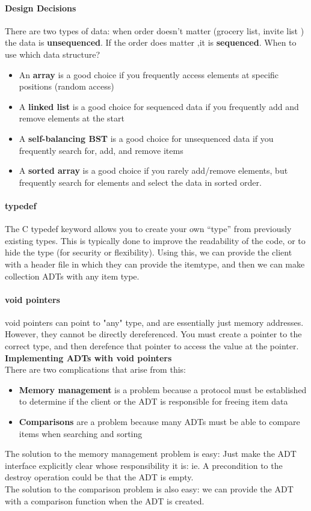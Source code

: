 \documentclass[10pt,letter]{article}
\begin{document}
{\paragraph{Design Decisions} There are two types of data: when order doesn't matter (grocery list, invite list ) the data is \textbf{unsequenced}. If the order does matter ,it is \textbf{sequenced}. When to use which data structure? \begin{itemize}
    \item An \textbf{array} is a good choice if you frequently access elements at specific positions (random access)
    \item A \textbf{linked list} is a good choice for sequenced data if you frequently add and remove elements at the start 
    \item A \textbf{self-balancing BST} is a good choice for unsequenced data if you frequently search for, add, and remove items 
    \item A \textbf{sorted array} is a good choice if you rarely add/remove elements, but frequently search for elements and select the data in sorted order. 
\end{itemize}

\paragraph{typedef} The C typedef keyword allows you to create your own “type” from previously existing types. This is typically done to improve the readability of the code, or to hide the type (for security or flexibility). Using this, we can provide the client with a header file in which they can provide the itemtype, and then we can make collection ADTs with any item type. 

\paragraph{void pointers} void pointers can point to "any" type, and are essentially just memory addresses. However, they cannot be directly dereferenced. You must create a pointer to the correct type, and then derefence that pointer to access the value at the pointer. \\ 
\textbf{Implementing ADTs with void pointers} \\ 
\hspace*{5pt} There are two complications that arise from this: \begin{itemize}
    \item \textbf{Memory management} is a problem because a protocol must be established to determine if the client or the ADT is responsible for freeing item data 
    \item \textbf{Comparisons} are a problem because many ADTs must be able to compare items when searching and sorting
\end{itemize}
The solution to the memory management problem is easy: Just make the ADT interface explicitly clear whose responsibility it is: ie. A precondition to the destroy operation could be that the ADT is empty.  \\ 
The solution to the comparison problem is also easy: we can provide the ADT with a comparison function when the ADT is created. 

}
\end{document}
